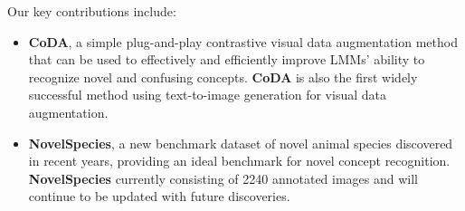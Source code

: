 
Our key contributions include:
\begin{itemize}[topsep=0pt, itemsep=0em, leftmargin=10pt]
    \item \textbf{CoDA}, a simple plug-and-play contrastive visual data augmentation method that can be used to effectively and efficiently improve LMMs' ability to recognize novel and confusing concepts. \textbf{CoDA} is also the first widely successful method using text-to-image generation for visual data augmentation. 
    \item \textbf{NovelSpecies}, a new benchmark dataset of novel animal species discovered in recent years, providing an ideal benchmark for novel concept recognition. \textbf{NovelSpecies} currently consisting of 2240 annotated images and will continue to be updated with future discoveries.
    
\end{itemize} 